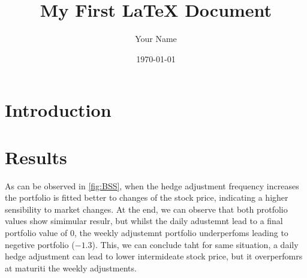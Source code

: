 \documentclass{article}
\begin{document}
\title{My First LaTeX Document}
\author{Your Name}
\date{\today}
\maketitle

\section{Introduction}



\section{Results}
As can be observed in \ref{fig:BSS}, when the hedge adjustment frequency increases the portfolio is
fitted better to changes of the stock price, indicating a higher sensibility to market changes.
At the end, we can observe that both protfolio values show simimular resulr, but
whilst the daily adustemnt lead to a final portfolio value of 0, the weekly adjustemnt portfolio underperfoms leading
to negetive portfolio ($-1.3$).
This, we can conclude taht for same situation, a daily hedge adjustment can lead to lower intermideate stock price, but
it overperfomrs at maturiti the weekly adjustments.
\end{document}
